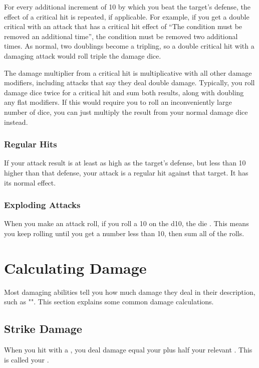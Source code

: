       For every additional increment of 10 by which you beat the target's defense, the effect of a critical hit is repeated, if applicable.
      For example, if you get a double critical with an attack that has a critical hit effect of ``The condition must be removed an additional time'', the condition must be removed two additional times.
      As normal, two doublings become a tripling, so a double critical hit with a damaging attack would roll triple the damage dice.

      The damage multiplier from a critical hit is multiplicative with all other damage modifiers, including attacks that say they deal double damage.
      Typically, you roll damage dice twice for a critical hit and sum both results, along with doubling any flat modifiers.
      If this would require you to roll an inconveniently large number of dice, you can just multiply the result from your normal damage dice instead.

    \subsubsection{Regular Hits}
      If your attack result is at least as high as the target's defense, but less than 10 higher than that defense, your attack is a regular hit against that target.
      It has its normal effect.

    \subsubsection{Exploding Attacks}\label{Exploding Attacks}
      When you make an attack roll, if you roll a 10 on the d10, the die .
      This means you keep rolling until you get a number less than 10, then sum all of the rolls.

\section{Calculating Damage}\label{Calculating Damage}
  Most damaging abilities tell you how much damage they deal in their description, such as "\damagerankone".
  This section explains some common damage calculations.

  \subsection{Strike Damage}\label{Strike Damage}
    When you hit with a , you deal damage equal your  plus half your relevant .
    This is called your .

